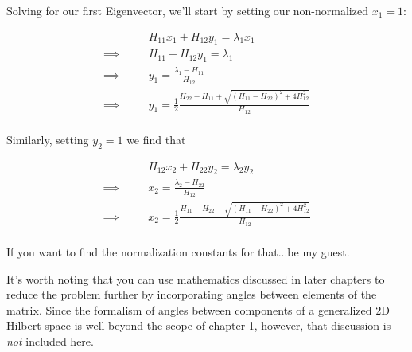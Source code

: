 \begin{answer}
  Solving for our first Eigenvector, we'll start by setting our
  non-normalized $x_1 = 1$:

  \begin{equation}
    \begin{alignedat}{2}
      & & H_{11}x_1 + H_{12}y_1 = \lambda_1x_1\\
      \implies \quad & & H_{11} + H_{12}y_1 = \lambda_1\\
      \implies \quad & & y_1 = \frac{\lambda_1 - H_{11}}{H_{12}}\\
      \implies \quad & & y_1 = \frac{1}{2}\frac{H_{22} - H_{11}+
      \sqrt{(H_{11} - H_{22})^2 + 4H_{12}^2}}{H_{12}}\\
    \end{alignedat}
  \end{equation}

  Similarly, setting $y_2 = 1$ we find that
  
  \begin{equation}
    \begin{alignedat}{2}
      & & H_{12}x_2 + H_{22}y_2 = \lambda_2y_2\\
      \implies \quad & & x_2 = \frac{\lambda_2 - H_{22}}{H_{12}}\\
      \implies \quad & & x_2 = \frac{1}{2}\frac{H_{11} - H_{22} -
      \sqrt{(H_{11} - H_{22})^2 + 4H_{12}^2}}{H_{12}}\\
    \end{alignedat}
  \end{equation}

  If you want to find the normalization constants for that...be my
  guest.

  It's worth noting that you can use mathematics discussed in later
  chapters to reduce the problem further by incorporating angles
  between elements of the matrix.  Since the formalism of angles
  between components of a generalized 2D Hilbert space is well beyond
  the scope of chapter 1, however, that discussion is \emph{not}
  included here.

\end{answer}
